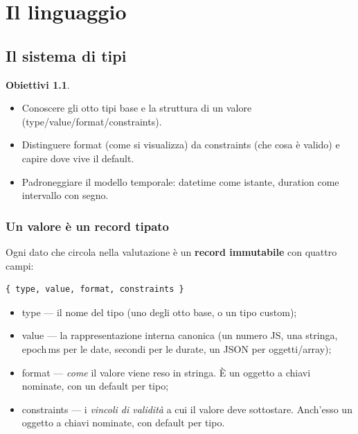 \documentclass[11pt,a4paper]{book}
\newcommand{\ic}[1]{{\ttfamily #1}}
\theoremstyle{definition}
\newtheorem*{obiettivi}{Obiettivi}
\begin{document}
{{{{%
\part{Il linguaggio}

\chapter{Il sistema di tipi}
\label{ch:tipi}

\begin{obiettivi}
\begin{itemize}
  \item Conoscere gli otto tipi base e la struttura di un valore
    (\ic{type}/\ic{value}/\ic{format}/\ic{constraints}).
  \item Distinguere \ic{format} (come si visualizza) da \ic{constraints} (che
    cosa è valido) e capire dove vive il \ic{default}.
  \item Padroneggiare il modello temporale: \ic{datetime} come istante,
    \ic{duration} come intervallo con segno.
\end{itemize}
\end{obiettivi}

\section{Un valore è un record tipato}

Ogni dato che circola nella valutazione è un \textbf{record immutabile} con
quattro campi:

\begin{lstlisting}
{ type, value, format, constraints }
\end{lstlisting}

\begin{itemize}
  \item \ic{type} --- il nome del tipo (uno degli otto base, o un tipo custom);
  \item \ic{value} --- la rappresentazione interna canonica (un numero JS, una
    stringa, epoch\,ms per le date, secondi per le durate, un JSON per
    oggetti/array);
  \item \ic{format} --- \emph{come} il valore viene reso in stringa. È un oggetto
    a chiavi nominate, con un default per tipo;
  \item \ic{constraints} --- i \emph{vincoli di validità} a cui il valore deve
    sottostare. Anch'esso un oggetto a chiavi nominate, con default per tipo.
\end{itemize}

}}}}
\end{document}
